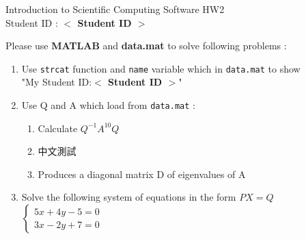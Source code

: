 \documentclass[12pt,a4paper]{article}
\newcommand{\placeholder}[1]{\textbf{$<$ #1 $>$}}
\newcommand{\idnumber}{\placeholder{Student ID}}
\begin{document}
\begin{flushleft}Introduction to Scientific Computing Software HW2
\\Student ID : \idnumber{}\end{flushleft}

Please use \textbf{MATLAB} and \textbf{data.mat} to solve following problems : 
\begin{enumerate}
\item Use \texttt{strcat} function and \texttt{name} variable which in \texttt{data.mat} to show \\"My Student ID:\idnumber{}"
\item Use Q and A which load from \texttt{data.mat} :
\begin{enumerate}
\item  Calculate $Q^{-1}A^{10}Q$
\item 中文測試
\item  Produces a diagonal matrix D of eigenvalues of A
\end{enumerate}
\item Solve the following system of equations in the form $PX=Q$ \\[1em] $\displaystyle{\left\{\begin{array}{l}5x+4y-5=0\\3x-2y+7=0\end{array}\right.}$
\end{enumerate}
\end{document}
